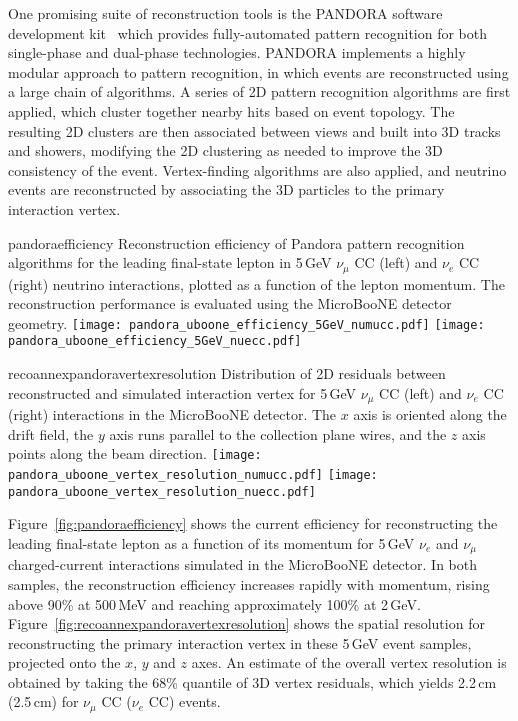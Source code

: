 One promising suite of reconstruction tools is the 
PANDORA software development kit~\cite{Marshall:2013bda,Marshall:2012hh}
which provides fully-automated pattern recognition for both single-phase 
and dual-phase technologies. 
PANDORA implements a highly modular approach to pattern recognition,
in which events are reconstructed using a large chain of algorithms. 
A series of 2D pattern recognition algorithms are first applied,
which cluster together nearby hits based on event topology.
The resulting 2D clusters are then associated between views
and built into 3D tracks and showers, modifying the 2D clustering 
as needed to improve the 3D consistency of the event. 
Vertex-finding algorithms are also applied,
and neutrino events are reconstructed by associating the 
3D particles to the primary interaction vertex.

\begin{cdrfigure}{pandoraefficiency}
{Reconstruction efficiency of Pandora pattern recognition algorithms
 for the leading final-state lepton in 5\,GeV $\nu_{\mu}$ CC (left) and
 $\nu_{e}$ CC (right) neutrino interactions, plotted as a function of
 the lepton momentum. The reconstruction performance is evaluated
 using the MicroBooNE detector geometry. }
\texttt{[image: pandora\_uboone\_efficiency\_5GeV\_numucc.pdf]}
\texttt{[image: pandora\_uboone\_efficiency\_5GeV\_nuecc.pdf]}
\end{cdrfigure}

\begin{cdrfigure}{recoannexpandoravertexresolution}
{Distribution of 2D residuals between reconstructed and simulated interaction
 vertex for 5\,GeV $\nu_{\mu}$ CC (left) and $\nu_{e}$ CC (right) interactions in the MicroBooNE detector.
 The $x$ axis is oriented along the drift field, the $y$ axis runs parallel 
 to the collection plane wires, and the $z$ axis points along the beam direction.}
\texttt{[image: pandora\_uboone\_vertex\_resolution\_numucc.pdf]}
\texttt{[image: pandora\_uboone\_vertex\_resolution\_nuecc.pdf]}
\end{cdrfigure}

Figure~\ref{fig:pandoraefficiency} shows the current efficiency for reconstructing
the leading final-state lepton as a function of its momentum
for 5\,GeV $\nu_{e}$ and $\nu_{\mu}$ charged-current interactions
simulated in the MicroBooNE detector.
In both samples, the reconstruction efficiency increases rapidly with momentum,
rising above 90\% at 500\,MeV and reaching approximately 100\% at 2\,GeV.
Figure~\ref{fig:recoannexpandoravertexresolution} shows the spatial resolution for
reconstructing the primary interaction vertex in these 5\,GeV event samples,
projected onto the $x$, $y$ and $z$ axes. An estimate of the overall vertex 
resolution is obtained by taking the 68\% quantile of 3D vertex residuals, 
which yields 2.2\,cm (2.5\,cm) for $\nu_{\mu}$ CC ($\nu_{e}$ CC) events.


